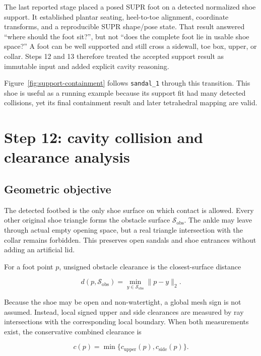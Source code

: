 \documentclass[11pt]{article}
\begin{document}
The last reported stage placed a posed SUPR foot on a detected normalized shoe support.
It established plantar seating, heel-to-toe alignment, coordinate transforms, and a
reproducible SUPR shape/pose state. That result answered ``where should the foot sit?'',
but not ``does the complete foot lie in usable shoe space?'' A foot can be well supported
and still cross a sidewall, toe box, upper, or collar. Steps 12 and 13 therefore treated
the accepted support result as immutable input and added explicit cavity reasoning.

Figure~\ref{fig:support-containment} follows \texttt{sandal\_1} through this transition.
This shoe is useful as a running example because its support fit had many detected
collisions, yet its final containment result and later tetrahedral mapping are valid.

\section{Step 12: cavity collision and clearance analysis}
\label{sec:cavity}

\subsection{Geometric objective}

The detected footbed is the only shoe surface on which contact is allowed. Every other
original shoe triangle forms the obstacle surface $\mathcal S_{\mathrm{obs}}$. The ankle
may leave through actual empty opening space, but a real triangle intersection with the
collar remains forbidden. This preserves open sandals and shoe entrances without adding
an artificial lid.

For a foot point $p$, unsigned obstacle clearance is the closest-surface distance

\begin{equation}
  d(p,\mathcal S_{\mathrm{obs}})=
  \min_{y\in\mathcal S_{\mathrm{obs}}}\|p-y\|_2.
\end{equation}

Because the shoe may be open and non-watertight, a global mesh sign is not assumed.
Instead, local signed upper and side clearances are measured by ray intersections with
the corresponding local boundary. When both measurements exist, the conservative
combined clearance is

\begin{equation}
  c(p)=\min\{c_{\mathrm{upper}}(p),c_{\mathrm{side}}(p)\}.
  \label{eq:combined-clearance}
\end{equation}
\end{document}
